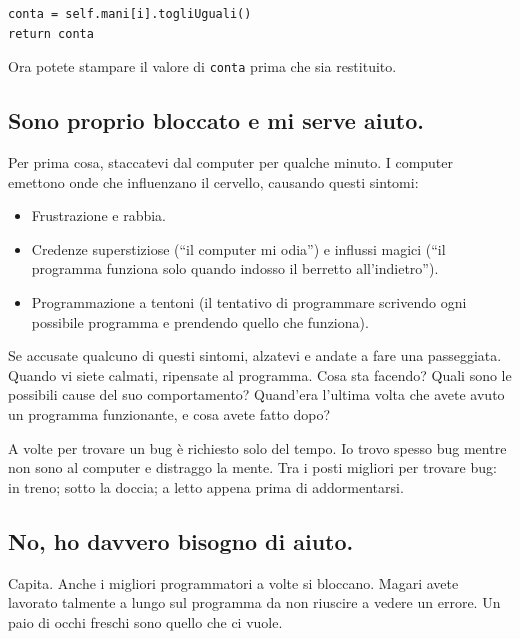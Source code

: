 \documentclass[10pt]{book}
\begin{document}
\begin{verbatim}
conta = self.mani[i].togliUguali()
return conta
\end{verbatim}
%
Ora potete stampare il valore di {\tt conta} prima che sia restituito.


\subsection{Sono proprio bloccato e mi serve aiuto.}

Per prima cosa, staccatevi dal computer per qualche minuto. I computer emettono onde che influenzano il cervello, causando questi sintomi:

\begin{itemize}

\item Frustrazione e rabbia.

\item Credenze superstiziose (``il computer mi odia'') e influssi magici (``il programma funziona solo quando indosso il berretto all'indietro'').

\item Programmazione a tentoni (il tentativo di programmare scrivendo ogni possibile programma e prendendo quello che funziona).

\end{itemize}

Se accusate qualcuno di questi sintomi, alzatevi e andate a fare una passeggiata. Quando vi siete calmati, ripensate al programma. Cosa sta facendo? Quali sono le possibili cause del suo comportamento? Quand'era l'ultima volta che avete avuto un programma funzionante, e cosa avete fatto dopo?

A volte per trovare un bug è richiesto solo del tempo. Io trovo spesso bug mentre non sono al computer e distraggo la mente. Tra i posti migliori per trovare bug: in treno; sotto la doccia; a letto appena prima di addormentarsi.


\subsection{No, ho davvero bisogno di aiuto.}

Capita. Anche i migliori programmatori a volte si bloccano. Magari avete lavorato talmente a lungo sul programma da non riuscire a vedere un errore. Un paio di occhi freschi sono quello che ci vuole.
\end{document}
